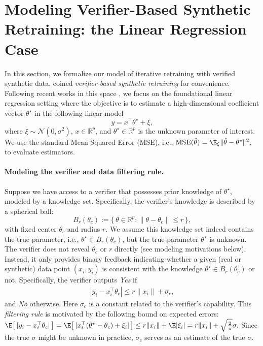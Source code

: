 \section{Modeling Verifier-Based Synthetic Retraining: the Linear Regression Case}\label{sec:linear}

In this section, we formalize our model of iterative retraining with verified synthetic data, coined \emph{verifier-based synthetic retraining} for convenience. Following recent works in this space \citep{dohmatob2024model,gerstgrasser2024model,garg2025preventing,zhusynthesize}, we focus on the foundational linear regression setting where the objective is to estimate a high-dimensional coefficient vector $\theta^\star$ in the following linear model
\[
y = x^{\top} \theta^\star + \xi,
\]
where $\xi \sim \mathcal{N}(0, \sigma^2)$, $x \in \mathbb{R}^p$, and $\theta^\star \in \mathbb{R}^p$ is the unknown parameter of interest. We use the standard Mean Squared Error (MSE), i.e., $\text{MSE}(\hat{\theta}) = \E_{\xi} \|\hat{\theta} - \theta^\star\|^2$, to evaluate estimators.

\paragraph{Modeling the verifier and data filtering rule.}  Suppose we have access to a verifier that possesses prior knowledge of $\theta^\star$, modeled by a knowledge set. Specifically,  the verifier's knowledge is described by a spherical ball:
\[
B_r(\theta_c) := \bigl\{\, \theta \in \mathbb{R}^p : \|\theta - \theta_c\| \leq r \,\bigr\},
\]
with fixed center $\theta_c$ and radius $r$.  We assume this knowledge set indeed contains the true parameter, i.e.,  $\theta^\star \in B_r(\theta_c)$, but  the true parameter $\theta^\star$ is unknown.  The verifier does not reveal $\theta_c$ or $r$ directly (see modeling motivations below). Instead, it  only provides binary feedback indicating whether a given (real or synthetic) data point $(x_i, y_i)$ is consistent with the knowledge $\theta^\star \in B_r(\theta_c)$ or not. Specifically, the verifier outputs \emph{Yes} if
\begin{align}
|y_i - x_i^{\top} \theta_c| \leq r \|x_i\| + \sigma_c, \label{equ:linear:verify_condition}
\end{align}
and \emph{No} otherwise. Here $\sigma_c$ is a  constant related to the verifier's capability.  This \emph{filtering rule} is motivated by the following bound on expected errors: 
$
\E\bigl[\,|y_i - x_i^{\top}\theta_c|\,\bigr] = \E\bigl[\,|x_i^{\top}(\theta^\star - \theta_c) + \xi_i|\,\bigr] \leq r\|x_i\| + \E|\xi_i| = r\|x_i\| + \sqrt{\tfrac{2}{\pi}}\sigma.
$
Since the true $\sigma$ might be unknown in practice, $\sigma_c$ serves as an estimate of the true $\sigma$. %

